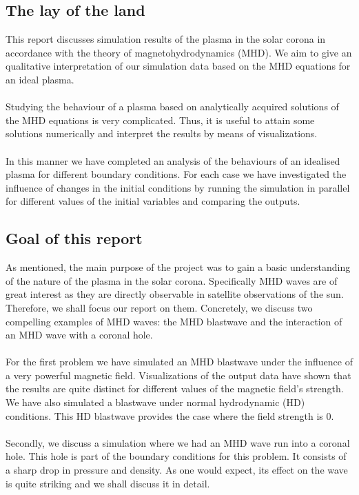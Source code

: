

\subsection*{The lay of the land}

This report discusses simulation results of the plasma in the solar corona in accordance with the theory of magnetohydrodynamics (MHD). We aim to give an qualitative interpretation of our simulation data based on the MHD equations for an ideal plasma.\\
\\
Studying the behaviour of a plasma based on analytically acquired solutions of the MHD equations is very complicated. Thus, it is useful to attain some solutions numerically and interpret the results by means of visualizations.\\
\\
In this manner we have completed an analysis of the behaviours of an idealised plasma for different boundary conditions. For each case we have investigated the influence of changes in the initial conditions by running the simulation in parallel for different values of the initial variables and comparing the outputs. 

\subsection*{Goal of this report}

As mentioned, the main purpose of the project was to gain a basic understanding of the nature of the plasma in the solar corona. Specifically MHD waves are of great interest as they are directly observable in satellite observations of the sun. Therefore, we shall focus our report on them. Concretely, we discuss two compelling examples of MHD waves: the MHD blastwave and the interaction of an MHD wave with a coronal hole.\\
\\
For the first problem we have simulated an MHD blastwave under the influence of a very powerful magnetic field. Visualizations of the output data have shown that the results are quite distinct for different values of the magnetic field's strength. We have also simulated a blastwave under normal hydrodynamic (HD) conditions. This HD blastwave provides the case where the field strength is $0$.\\
\\
Secondly, we discuss a simulation where we had an MHD wave run into a coronal hole. This hole is part of the boundary conditions for this problem. It consists of a sharp drop in pressure and density. As one would expect, its effect on the wave is quite striking and we shall discuss it in detail. 

